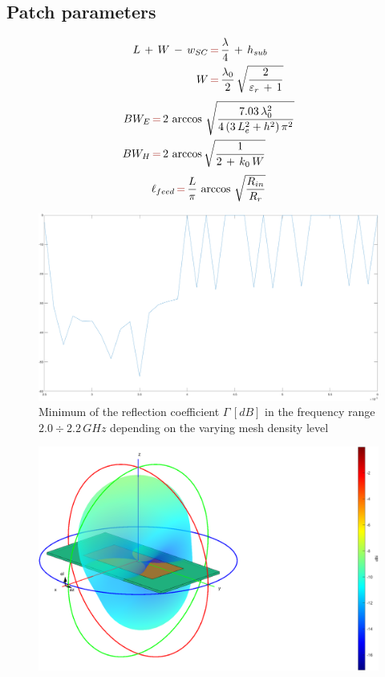 \documentclass[12pt,a4paper]{article}
\begin{document}
{\subsection*{Patch parameters}
\begin{equation}\begin{aligned}L\,+\,W\,-\,w_{SC}\,&{\color{Mahogany}=}\,\frac{\lambda}{4}\,+\,h_{sub}\\
W\,&{\color{Mahogany}=}\,\frac{\lambda_0}{2}\,\sqrt{\frac{2}{\varepsilon_r\,+\,1}}\\
\end{aligned}
\end{equation}
\begin{equation}
\begin{aligned}
BW_E\,&{\color{Mahogany}=}\,2\,\arccos\,\sqrt{\frac{7.03\,\lambda_0^2}{4\,(3\,L_e^2+h^2)\,\pi^2}}\\
BW_H\,&{\color{Mahogany}=}\,2\,\arccos\sqrt{\frac{1}{2\,+\,k_0\,W}}\\
\end{aligned}
\end{equation}
\begin{equation}
\ell_{feed}\,{\color{Mahogany}=}\,\frac{L}{\pi}\,\arccos\,\sqrt{\frac{R_{in}}{R_r}}
\end{equation}
\begin{center}
	\begin{figure}[h]
		\includegraphics[scale=0.3]{mesh_levels.png}
		\caption{{Minimum of the reflection coefficient $\Gamma\, [dB]$ in the frequency range $2.0\div 2.2\,GHz$ depending on the varying mesh density level}}
	\end{figure}
\end{center}
\begin{center}
\begin{figure}
\includegraphics[width = 0.3\linewidth]{gain_patch.png}

\end{figure}
\end{center}}
\end{document}
